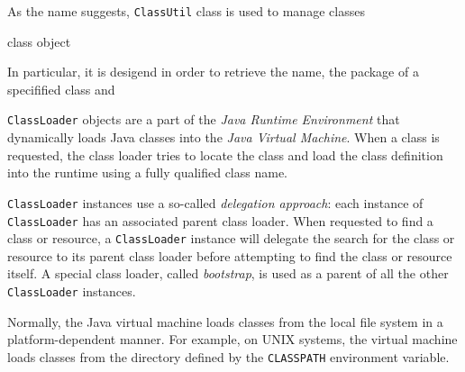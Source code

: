 \documentclass[sigconf]{acmart}
\begin{document}
As the name suggests, \texttt{ClassUtil} class is used to manage classes 

class object

 In particular, it is desigend in order to retrieve the name, the package of a specifified class and 

\texttt{ClassLoader} objects are a part of the \textit{Java Runtime Environment} that dynamically loads Java classes into the \textit{Java Virtual Machine}. When a class is requested, the class loader tries to locate the class and load the class definition into the runtime using a fully qualified class name. 

\texttt{ClassLoader} instances use a so-called \textit{delegation approach}: each instance of \texttt{ClassLoader} has an associated parent class loader. When requested to find a class or resource, a \texttt{ClassLoader} instance will delegate the search for the class or resource to its parent class loader before attempting to find the class or resource itself. A special class loader, called \textit{bootstrap}, is used as a parent of all the other \texttt{ClassLoader} instances. 

Normally, the Java virtual machine loads classes from the local file system in a platform-dependent manner. For example, on UNIX systems, the virtual machine loads classes from the directory defined by the \texttt{CLASSPATH} environment variable. 
\end{document}
